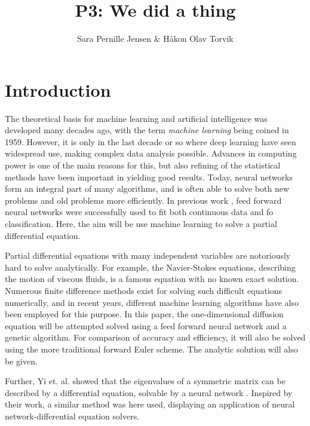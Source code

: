 \documentclass[multicolumn, 9pt]{extarticle}
\author{\Large Sara Pernille Jensen \& Håkon Olav Torvik}
\title{\Huge P3: We did a thing}
\affiliation{\large FYS-STK4155 – Applied Data Analysis and Machine Learning
\\Autumn 2021\\Department of Physics\\University of Oslo\\\\\today}
\begin{document}



\maketitle

\pagestyle{myplain}


\twocolumn
\section{Introduction}

The theoretical basis for machine learning and artificial intelligence was developed many decades ago, with the term \textit{machine learning} being coined in 1959. However, it is only in the last decade or so where deep learning have seen widespread use, making complex data analysis possible. Advances in computing power is one of the main reasons for this, but also refining of the statistical methods have been important in yielding good results. Today, neural networks form an integral part of many algorithms, and is often able to solve both new problems and old problems more efficiently. In previous work \cite{p2S} \cite{p2HO}, feed forward neural networks were successfully used to fit both continuous data and fo classification. Here, the aim will be use machine learning to solve a partial differential equation. 

Partial differential equations with many independent variables are notoriously hard to solve analytically. For example, the Navier-Stokes equations, describing the motion of viscous fluids, is a famous equation with no known exact solution. Numerous finite difference methods exist for solving such difficult equations numerically, and in recent years, different machine learning algorithms have also been employed for this purpose. In this paper, the one-dimensional diffusion equation will be attempted solved using a feed forward neural network and a genetic algorithm. For comparison of accuracy and efficiency, it will also be solved using the more traditional forward Euler scheme. The analytic solution will also be given. 

Further, Yi et. al. showed that the eigenvalues of a symmetric matrix can be described by a differential equation, solvable by a neural network \cite{symmetric}. Inspired by their work, a similar method was here used, displaying an application of neural network-differential equation solvers. 
\end{document}
